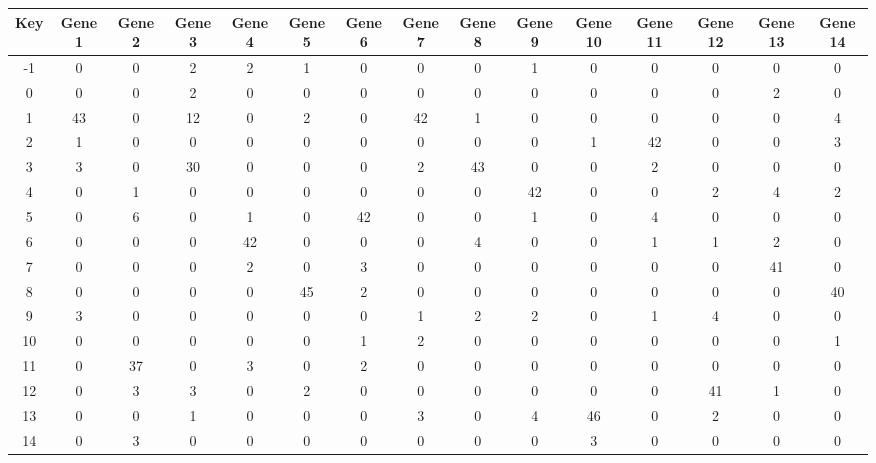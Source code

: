 \begin{tabular}{|c|c|c|c|c|c|c|c|c|c|c|c|c|c|c|}
\hline
Key & Gene 1 & Gene 2 & Gene 3 & Gene 4 & Gene 5 & Gene 6 & Gene 7 & Gene 8 & Gene 9 & Gene 10 & Gene 11 & Gene 12 & Gene 13 & Gene 14 \\
\hline
-1 & 0 & 0 & 2 & 2 & 1 & 0 & 0 & 0 & 1 & 0 & 0 & 0 & 0 & 0 \\
0 & 0 & 0 & 2 & 0 & 0 & 0 & 0 & 0 & 0 & 0 & 0 & 0 & 2 & 0 \\
1 & 43 & 0 & 12 & 0 & 2 & 0 & 42 & 1 & 0 & 0 & 0 & 0 & 0 & 4 \\
2 & 1 & 0 & 0 & 0 & 0 & 0 & 0 & 0 & 0 & 1 & 42 & 0 & 0 & 3 \\
3 & 3 & 0 & 30 & 0 & 0 & 0 & 2 & 43 & 0 & 0 & 2 & 0 & 0 & 0 \\
4 & 0 & 1 & 0 & 0 & 0 & 0 & 0 & 0 & 42 & 0 & 0 & 2 & 4 & 2 \\
5 & 0 & 6 & 0 & 1 & 0 & 42 & 0 & 0 & 1 & 0 & 4 & 0 & 0 & 0 \\
6 & 0 & 0 & 0 & 42 & 0 & 0 & 0 & 4 & 0 & 0 & 1 & 1 & 2 & 0 \\
7 & 0 & 0 & 0 & 2 & 0 & 3 & 0 & 0 & 0 & 0 & 0 & 0 & 41 & 0 \\
8 & 0 & 0 & 0 & 0 & 45 & 2 & 0 & 0 & 0 & 0 & 0 & 0 & 0 & 40 \\
9 & 3 & 0 & 0 & 0 & 0 & 0 & 1 & 2 & 2 & 0 & 1 & 4 & 0 & 0 \\
10 & 0 & 0 & 0 & 0 & 0 & 1 & 2 & 0 & 0 & 0 & 0 & 0 & 0 & 1 \\
11 & 0 & 37 & 0 & 3 & 0 & 2 & 0 & 0 & 0 & 0 & 0 & 0 & 0 & 0 \\
12 & 0 & 3 & 3 & 0 & 2 & 0 & 0 & 0 & 0 & 0 & 0 & 41 & 1 & 0 \\
13 & 0 & 0 & 1 & 0 & 0 & 0 & 3 & 0 & 4 & 46 & 0 & 2 & 0 & 0 \\
14 & 0 & 3 & 0 & 0 & 0 & 0 & 0 & 0 & 0 & 3 & 0 & 0 & 0 & 0 \\
\hline
\end{tabular}